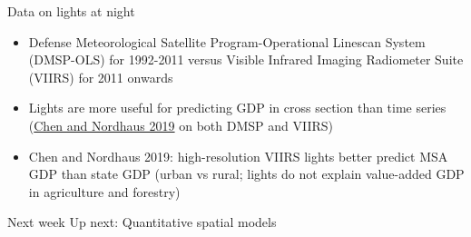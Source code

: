 \documentclass[11pt,notes=hide,aspectratio=169]{beamer}
\begin{document}
\begin{frame}{Data on lights at night}
\begin{itemize}
	\item Defense Meteorological Satellite Program-Operational Linescan System (DMSP-OLS) for 1992-2011
	versus
	Visible Infrared Imaging Radiometer Suite (VIIRS) for 2011 onwards
	\item Lights are more useful for predicting GDP in cross section than time series (\href{https://www.mdpi.com/2072-4292/11/9/1057}{Chen and Nordhaus 2019} on both DMSP and VIIRS)
	\item Chen and Nordhaus 2019: high-resolution VIIRS lights better predict MSA GDP than state GDP (urban vs rural; lights do not explain value-added GDP in agriculture and forestry)
\end{itemize}
\end{frame}
\begin{frame}{Next week}
Up next: Quantitative spatial models
\end{frame}
\end{document}
